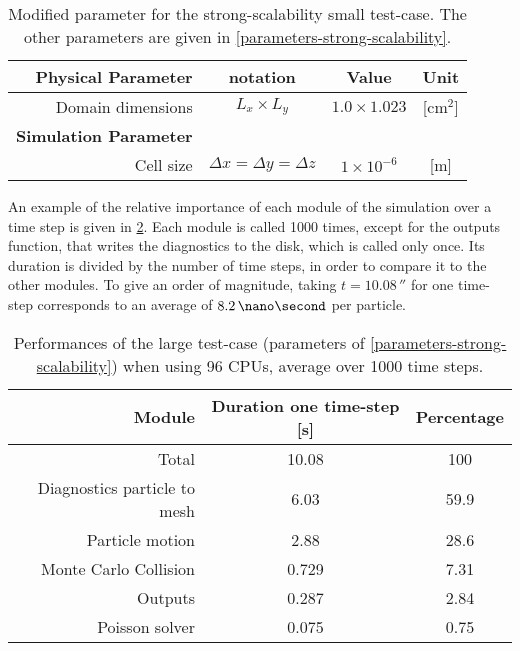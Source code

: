   \begin{table}[hbt]
    \centering
    \caption{Modified parameter for the strong-scalability small test-case. The other parameters are given in \cref{parameters-strong-scalability}. }
    \label{tab-peremeters-small}
    \begin{tabular}{@{}r c c c@{}} 
      \toprule
      {\bf Physical Parameter} & notation & Value & Unit \\
      \midrule
      Domain dimensions & $L_{x} \times L_{y}$ & $1.0 \times 1.023$ & [cm$^2$] \\
      \midrule
      {\bf Simulation Parameter} &  &   &  \\
      Cell size & $\Delta x = \Delta y = \Delta z $ & $1 \times 10^{-6}$  & [{m}] \\
    \bottomrule
    \end{tabular}
  \end{table}
  
  An example of the relative importance of each module of the simulation over a time step is given in \cref{tab-example_perf}.
  Each module is called 1000 times, except for the outputs function, that writes the diagnostics to the disk, which is called only once.
  Its duration is divided by the number of time steps, in order to compare it to the other modules.
  To give an order of magnitude, taking $t=10.08\,\second$ for one time-step corresponds to an average of $8.2\,\nano\second$ per particle.
  
  \begin{table}[hbt]
    \centering
    \caption{Performances of the large test-case (parameters of \cref{parameters-strong-scalability}) when using 96 CPUs, average over 1000 time steps. }
    \label{tab-example_perf}
    \begin{tabular}{@{}r c c@{}} 
      \toprule
    Module  & Duration one time-step [s]  & Percentage \\
    \midrule
    Total & 10.08 & 100 \\
    Diagnostics particle to mesh & 6.03 & 59.9 \\
    Particle motion & 2.88 & 28.6 \\
    Monte Carlo Collision & 0.729 & 7.31 \\
    Outputs & 0.287 & 2.84 \\
    Poisson solver & 0.075 & 0.75 \\
    \bottomrule
    \end{tabular}
  \end{table}
  

